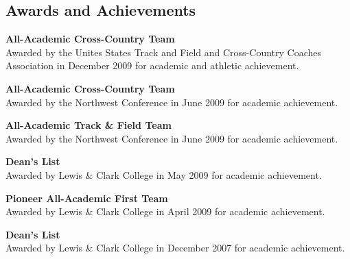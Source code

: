 \documentclass{res}
\begin{document}
\begin{resume}
\section{Awards and Achievements}
    \textbf{All-Academic Cross-Country Team}\\
    Awarded by the Unites States Track and Field and Cross-Country Coaches
    Association in December 2009 for academic and athletic achievement.

    \textbf{All-Academic Cross-Country Team}\\
    Awarded by the Northwest Conference in June 2009 for academic achievement.
 
    \textbf{All-Academic Track \& Field Team}\\
    Awarded by the Northwest Conference in June 2009 for academic achievement.
 
    \textbf{Dean's List}\\
    Awarded by Lewis \& Clark College in May 2009 for academic achievement.
 
    \textbf{Pioneer All-Academic First Team}\\
    Awarded by Lewis \& Clark College in April 2009 for academic achievement.
 
    \textbf{Dean's List}\\
    Awarded by Lewis \& Clark College in December 2007 for academic achievement.


\end{resume}
\end{document}

